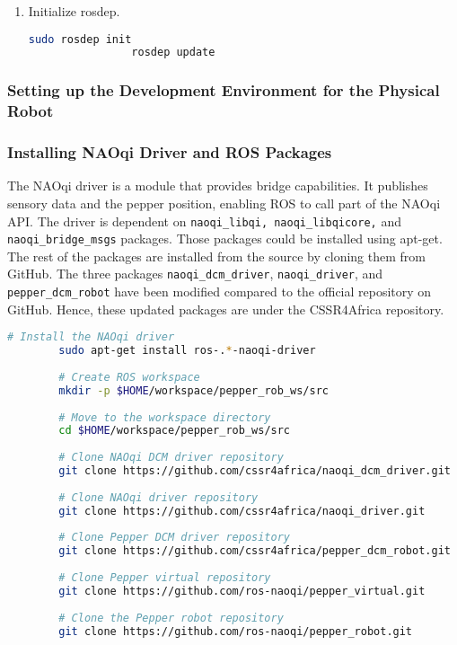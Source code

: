\documentclass{CSSRforAfrica}
\begin{document}
{{\begin{enumerate}
				\item Initialize rosdep.
				\begin{lstlisting}[style=withoutNumbering, language=bash]
				sudo rosdep init
				rosdep update
				\end{lstlisting}
			\end{enumerate}
		}
		\subsubsection{Setting up the Development Environment for the Physical Robot}
		\label{phyrob}
		\subsubsection*{Installing NAOqi Driver and ROS Packages}
		
		The NAOqi driver is a module that provides bridge capabilities. It publishes sensory data and the pepper position, enabling ROS to call part of the NAOqi API. The driver is dependent on \texttt{naoqi\_libqi, naoqi\_libqicore,} and \texttt{naoqi\_bridge\_msgs} packages. Those packages could be installed using apt-get. The rest of the packages are installed from the source by cloning them from GitHub. The three packages \texttt{naoqi\_dcm\_driver}, \texttt{naoqi\_driver}, and \texttt{pepper\_dcm\_robot} have been modified compared to the official repository on GitHub. Hence, these updated packages are under the CSSR4Africa repository.
		
		\begin{lstlisting}[style=withoutNumbering, language=bash]
		# Install the NAOqi driver
		sudo apt-get install ros-.*-naoqi-driver
		
		# Create ROS workspace
		mkdir -p $HOME/workspace/pepper_rob_ws/src
		
		# Move to the workspace directory
		cd $HOME/workspace/pepper_rob_ws/src
		
		# Clone NAOqi DCM driver repository
		git clone https://github.com/cssr4africa/naoqi_dcm_driver.git
		
		# Clone NAOqi driver repository
		git clone https://github.com/cssr4africa/naoqi_driver.git
		
		# Clone Pepper DCM driver repository
		git clone https://github.com/cssr4africa/pepper_dcm_robot.git
		
		# Clone Pepper virtual repository
		git clone https://github.com/ros-naoqi/pepper_virtual.git
		
		# Clone the Pepper robot repository
		git clone https://github.com/ros-naoqi/pepper_robot.git
		

\end{lstlisting}}
\end{document}

